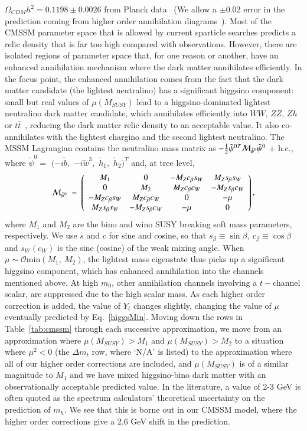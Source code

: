 \documentclass[final,3p,times,pdflatex]{elsarticle}
\begin{document}
$\Omega_{CDM} h^2=0.1198 \pm 0.0026$ from Planck data~\cite{Ade:2013zuv} (We
allow a $\pm 0.02$ error in the prediction coming from higher order
annihilation diagrams~\cite{Baro:2009na}).
Most of the CMSSM parameter space that is allowed by current sparticle
searches predicts a relic density that is far too high compared with
observations. However, there are isolated regions of parameter space that, for
one reason or another, have an enhanced annihilation mechanism where the dark
matter annihilates efficiently. In the focus point, the enhanced annihilation
comes from the fact that the dark matter candidate (the lightest neutralino)
has a significant higgsino component: small but real
values of $\mu(M_{SUSY})$ lead to a higgsino-dominated lightest neutralino dark
matter candidate, which annihilates efficiently into $WW$, $ZZ$, $Zh$ or $t
\bar t$~\cite{Feng:2000gh}, reducing the dark matter relic density to an
acceptable value. It also co-annihilates with the lightest chargino and the
second lightest neutralino. 
The MSSM Lagrangian contains the neutralino mass matrix as
$-\frac{1}{2}
{\tilde\psi^0}{}^T{\cal M}_{\tilde\psi^0}\tilde\psi^0$ + h.c., where
$\tilde\psi^0 =$ $(-i\tilde b,$ $-i\tilde w^3,$ $\tilde h_1,$ $\tilde
h_2)^T$ and, at tree level,
%
\begin{equation}
{\cal M}_{\tilde\psi^0} \ =\ \left(\begin{array}{cccc} M_1 & 0 &
-M_Zc_\beta s_W & M_Zs_\beta s_W \\ 0 & M_2 & M_Zc_\beta c_W &
-M_Zs_\beta c_W \\ -M_Zc_\beta s_W & M_Zc_\beta c_W & 0 & -\mu \\
M_Zs_\beta s_W & -M_Zs_\beta c_W & -\mu & 0
\end{array} \right),\label{mchi0}
\end{equation}
%
where $M_1$ and $M_2$ are the bino and wino SUSY breaking soft mass
parameters, respectively.
We use $s$ and $c$ for sine and cosine, so that
$s_\beta\equiv\sin\beta,\ c_{\beta}\equiv\cos\beta$ and $s_W (c_W)$ is
the sine (cosine) of the weak mixing angle. When $\mu \sim {\mathcal
  O}\text{min}(M_1,\ M_2)$, 
the lightest mass eigenstate thus picks up a significant higgsino component, 
which has enhanced annihilation into the channels mentioned above. At high
$m_0$, other annihilation channels involving a $t-$channel scalar, are 
suppressed due to the high scalar mass. 
As each higher order correction is added, the value of $Y_t$ changes slightly,
changing the value of $\mu$ eventually predicted by Eq.~\ref{higgsMin}. 
Moving down the rows in Table~\ref{tab:cmssm} through each successive
approximation, we move from an approximation 
where $\mu(M_{SUSY}) > M_1$ and $\mu(M_{SUSY}) >
M_2$ to a situation where $\mu^2<0$ (the $\Delta m_t$ row, where `N/A' is
listed) to the approximation where all of our higher order corrections are
included, and $\mu(M_{SUSY})$ is of a similar magnitude to $M_1$ and
we have mixed 
higgsino-bino dark matter with an observationally acceptable predicted value.
In the literature,  a value of 2-3 GeV is often quoted as the spectrum
calculators' theoretical uncertainty on the prediction of $m_h$. We see that
this is borne out in our CMSSM model, where the higher order corrections give
a 2.6 GeV shift in the prediction.
\end{document}
